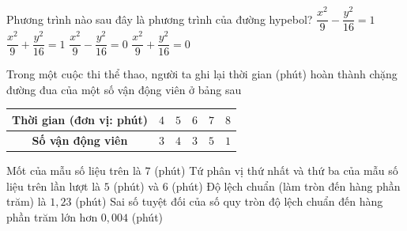 \begin{ex}%
Phương trình nào sau đây là phương trình của đường hypebol?
\choice
{\True $\dfrac{x^2}{9} - \dfrac{y^2}{16} = 1$}
{$\dfrac{x^2}{9} + \dfrac{y^2}{16} = 1$}
{$\dfrac{x^2}{9} - \dfrac{y^2}{16} = 0$}
{$\dfrac{x^2}{9} + \dfrac{y^2}{16} = 0$}
\end{ex}
\TNTF
\begin{ex}%
Trong một cuộc thi thể thao, người ta ghi lại thời gian (phút) hoàn thành chặng đường đua của một số vận động viên ở bảng sau
\begin{center}
\begin{tabular}{|c|c|c|c|c|c|}
\hline
\textbf{Thời gian (đơn vị: phút)}&$4$&$5$&$6$&$7$&$8$ \\
\hline
\textbf{Số vận động viên}&$3$&$4$&$3$&$5$&$1$ \\
\hline
\end{tabular}
\end{center}
\choiceTF
{\True Mốt của mẫu số liệu trên là $7$ (phút)}
{Tứ phân vị thứ nhất và thứ ba của mẫu số liệu trên lần lượt là $5$ (phút) và $6$ (phút)}
{Độ lệch chuẩn (làm tròn đến hàng phần trăm) là $1{,}23$ (phút)}
{\True Sai số tuyệt đối của số quy tròn độ lệch chuẩn đến hàng phần trăm lớn hơn $0{,}004$ (phút)}


\end{ex}
